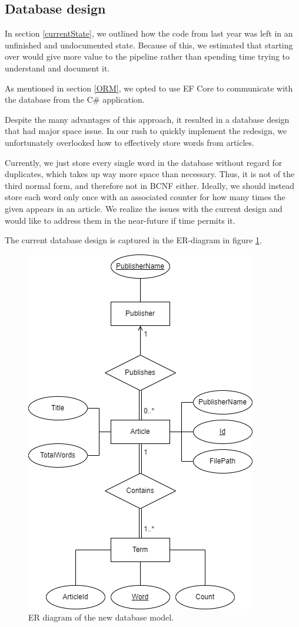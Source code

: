 \subsection{Database design}\label{InitialDesign}

In section \ref{currentState}, we outlined how the code from last year was left in an unfinished and undocumented state. Because of this, we estimated that starting over would give more value to the pipeline rather than spending time trying to understand and document it.

As mentioned in section \ref{ORM}, we opted to use EF Core to communicate with the database from the C\# application.

Despite the many advantages of this approach, it resulted in a database design that had major space issue.
In our rush to quickly implement the redesign, we unfortunately overlooked how to effectively store words from articles. 

Currently, we just store every single word in the database without regard for duplicates, which takes up way more space than necessary. Thus, it is not of the third normal form, and therefore not in BCNF either.
Ideally, we should instead store each word only once with an associated counter for how many times the given appears in an article.
We realize the issues with the current design and would like to address them in the near-future if time permits it.

The current database design is captured in the ER-diagram in figure \ref{newdatabaseER}.

\begin{figure}[htb!]
    \centering
    \includegraphics[scale=0.6]{Images/New database model.png}
    \caption{ER diagram of the new database model.}
    \label{newdatabaseER}
\end{figure}

